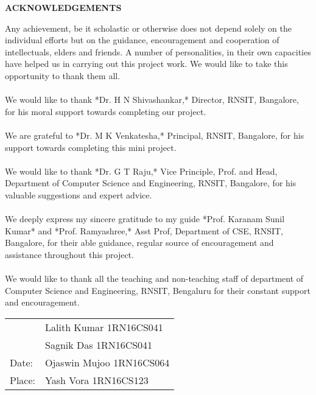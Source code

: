\thispagestyle{empty}
\begin{center}
\textup{\large{\textbf{ACKNOWLEDGEMENTS}}} \\[0.1in]
\end{center}

\justify
\indent
Any achievement, be it scholastic or otherwise does not depend solely on the individual efforts but on the guidance, encouragement and cooperation of intellectuals, elders and friends. A number of personalities, in their own capacities have helped us in carrying out this project work. We would like to take this opportunity to thank them all.  \\  \\ We would like to thank *Dr. H N Shivashankar,* Director, RNSIT, Bangalore, for his moral support towards completing our project. \\  \\ We are grateful to *Dr. M K Venkatesha,* Principal, RNSIT, Bangalore, for his support towards completing this mini project.  \\  \\ We would like to thank *Dr. G T Raju,* Vice Principle, Prof. and Head, Department of Computer Science and Engineering, RNSIT, Bangalore, for his valuable suggestions and expert advice.  \\  \\ We deeply express my sincere gratitude to my guide *Prof. Karanam Sunil Kumar* and *Prof. Ramyashree,* Asst Prof, Department of CSE, RNSIT, Bangalore, for their able guidance, regular source of encouragement and assistance throughout this project.  \\  \\ We would like to thank all the teaching and non-teaching staff of department of Computer Science and Engineering, RNSIT, Bengaluru for their constant support and encouragement. \\
\vfill

\justify
\begin{tabularx}{\linewidth}{X X}
 & {\hfill}\textup{Lalith Kumar 1RN16CS041}\\ 
  & {\hfill}\textup{Sagnik Das 1RN16CS041}\\ 
 \textup{Date:} & {\hfill}\textup{Ojaswin Mujoo 1RN16CS064}\\
\textup{Place:} & {\hfill}\textup{Yash Vora 1RN16CS123}\\
\end{tabularx}


\pagebreak